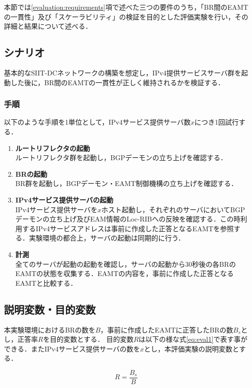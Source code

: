 本節では\ref{evaluation:requirements}項で述べた三つの要件のうち，「BR間のEAMTの一貫性」及び「スケーラビリティ」の検証を目的とした評価実験を行い，その詳細と結果について述べる．

\subsection{シナリオ}
基本的なSIIT-DCネットワークの構築を想定し，IPv4提供サービスサーバ群を起動した後に，BR間のEAMTの一貫性が正しく維持されるかを検証する．

\subsubsection{手順}
以下のような手順を1単位として，IPv4サービス提供サーバ数$x$につき1回試行する．
\begin{enumerate}
    \item \textbf{ルートリフレクタの起動} \\
    ルートリフレクタ群を起動し，BGPデーモンの立ち上げを確認する．
    \item \textbf{BRの起動} \\
    BR群を起動し，BGPデーモン・EAMT制御機構の立ち上げを確認する．
    \item \textbf{IPv4サービス提供サーバの起動} \\
    IPv4サービス提供サーバを$x$ホスト起動し，それぞれのサーバにおいてBGPデーモンの立ち上げ及びEAM情報のLoc-RIBへの反映を確認する．この時利用するIPv4サービスアドレスは事前に作成した正答となるEAMTを参照する．実験環境の都合上，サーバの起動は同期的に行う．
    \item \textbf{計測} \\
    全てのサーバが起動の起動を確認し，サーバの起動から30秒後の各BRのEAMTの状態を収集する．EAMTの内容を，事前に作成した正答となるEAMTと比較する．
\end{enumerate}

\subsection{説明変数・目的変数}
本実験環境におけるBRの数を$B$，事前に作成したEAMTに正答したBRの数$B_s$とし，正答率$R$を目的変数とする．
目的変数$R$は以下の様な式\ref{eq:eval1}で表す事ができる．またIPv4サービス提供サーバの数を$x$とし，本評価実験の説明変数とする．

\begin{equation}
    R = \frac{B_s}{B}
    \label{eq:eval1}
\end{equation}


